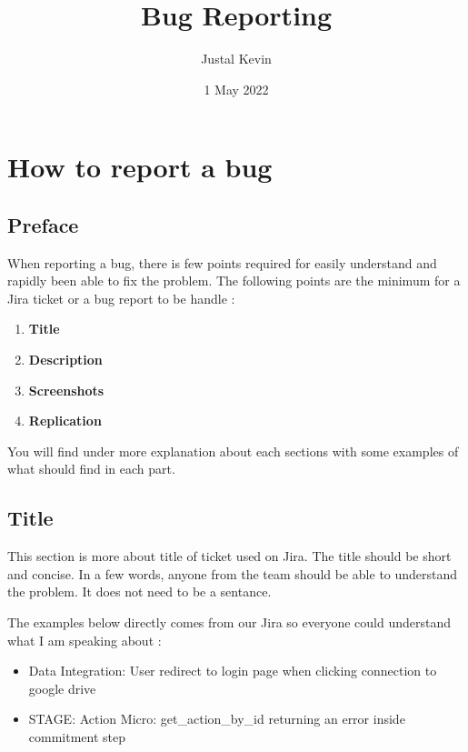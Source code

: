 \documentclass[a4paper,article,oneside]{memoir}
\title{\textbf{Bug Reporting}}
\author{Justal Kevin}
\date{1 May 2022}
\begin{document}
\maketitle
\thispagestyle{empty}
\renewcommand{\contentsname}{Table of contents}
\tableofcontents*
\part{How to report a bug}
	\chapter*{Preface}
		When reporting a bug, there is few points required for easily understand and rapidly been able to fix the problem. The following points are the minimum for a Jira ticket or a bug report to be handle :
	
        \begin{enumerate}
  			\item {\color{BrickRed}\textbf{Title}}
  			\item {\color{BrickRed}\textbf{Description}}
  			\item {\color{BrickRed}\textbf{Screenshots}}
  			\item {\color{BrickRed}\textbf{Replication}}
		\end{enumerate}
		
	You will find under more explanation about each sections with some examples of what should find in each part.
		\chapter{Title}
		This section is more about title of ticket used on Jira. The title should be short and concise. In a few words, anyone from the team should be able to understand the problem. It does not need to be a sentance.
		
		The examples below directly comes from our Jira so everyone could understand what I am speaking about :
		
\noindent{}

\begin{itemize}
  \item Data Integration: User redirect to login page when clicking connection to google drive
  \item STAGE: Action Micro: get\_action\_by\_id returning an error inside commitment step
\end{itemize}
\end{document}
